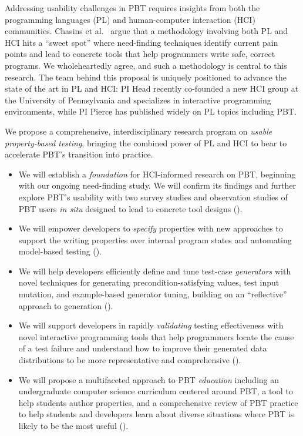 Addressing usability challenges in PBT requires insights from both the
programming languages (PL) and
human-computer interaction (HCI) communities.  Chasins et
al.~\cite{chasins_pl_2021} argue that a methodology
involving
both PL and HCI hits a ``sweet spot'' where need-finding techniques identify
current pain points and lead to concrete tools that help programmers write
safe, correct programs. We wholeheartedly agree, and such a methodology is
central to this research.
The team behind this proposal is uniquely positioned to advance the
state of the art in PL and HCI: PI Head recently co-founded
a new HCI group at the University of Pennsylvania and specializes in interactive
programming environments, while PI Pierce has
published widely on PL topics including PBT.

We propose a comprehensive, interdisciplinary research program on \emph{usable
property-based testing}, bringing the combined power of PL and HCI to bear to
accelerate PBT's transition into practice.
\begin{itemize}[noitemsep]
\item We will establish a \emph{foundation} for HCI-informed research on PBT,
beginning with our ongoing need-finding study. We will confirm
its findings and further explore PBT's usability with
two survey studies and observation studies
of PBT users {\em in situ} designed to lead to concrete tool designs
().
  \item We will empower developers to \emph{specify} properties with new approaches
to support the writing properties over internal program states and
automating model-based testing ().
  \item We will help developers efficiently define and tune test-case
\emph{generators} with novel techniques for generating precondition-satisfying
values, test input mutation, and example-based generator tuning, building
  on an ``reflective'' approach to generation ().
  \item We will support developers in rapidly \emph{validating} testing
  effectiveness with novel interactive programming tools that help programmers
locate the cause of a test failure and understand how to improve their generated
data distributions to be more representative and comprehensive
().
  \item We will propose a multifaceted approach to PBT \emph{education}
  including an undergraduate computer science curriculum centered around PBT, a
  tool to help students author properties, and a comprehensive review of PBT
  practice to help students and developers learn about diverse situations where
  PBT is likely to be the most useful ().
\end{itemize}


